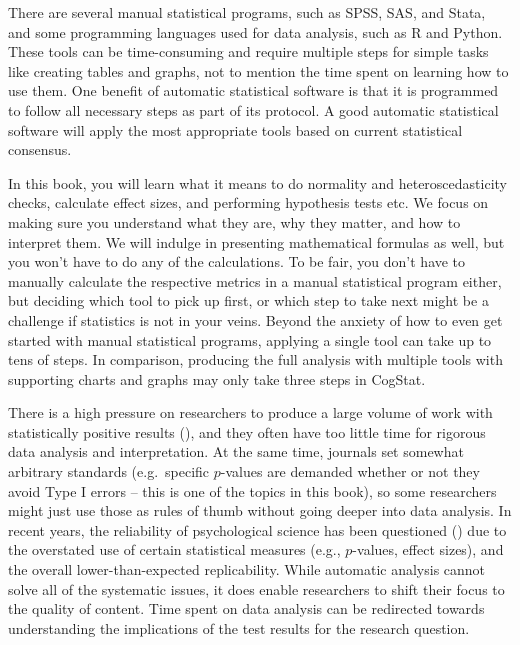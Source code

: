 \documentclass[
  11pt,
  a4paper,
  twoside,symmetric,openright]{book}
\theoremstyle{break}
\theoremstyle{break}
\begin{document}
There are several manual statistical programs, such as SPSS, SAS, and Stata, and some programming languages used for data analysis, such as R and Python. These tools can be time-consuming and require multiple steps for simple tasks like creating tables and graphs, not to mention the time spent on learning how to use them. One benefit of automatic statistical software is that it is programmed to follow all necessary steps as part of its protocol. A good automatic statistical software will apply the most appropriate tools based on current statistical consensus.

In this book, you will learn what it means to do normality and heteroscedasticity checks, calculate effect sizes, and performing hypothesis tests etc. We focus on making sure you understand what they are, why they matter, and how to interpret them. We will indulge in presenting mathematical formulas as well, but you won't have to do any of the calculations. To be fair, you don't have to manually calculate the respective metrics in a manual statistical program either, but deciding which tool to pick up first, or which step to take next might be a challenge if statistics is not in your veins. Beyond the anxiety of how to even get started with manual statistical programs, applying a single tool can take up to tens of steps. In comparison, producing the full analysis with multiple tools with supporting charts and graphs may only take three steps in CogStat.

There is a high pressure on researchers to produce a large volume of work with statistically positive results (), and they often have too little time for rigorous data analysis and interpretation. At the same time, journals set somewhat arbitrary standards (e.g.~specific \(p\)-values are demanded whether or not they avoid Type I errors -- this is one of the topics in this book), so some researchers might just use those as rules of thumb without going deeper into data analysis. In recent years, the reliability of psychological science has been questioned () due to the overstated use of certain statistical measures (e.g., \(p\)-values, effect sizes), and the overall lower-than-expected replicability. While automatic analysis cannot solve all of the systematic issues, it does enable researchers to shift their focus to the quality of content. Time spent on data analysis can be redirected towards understanding the implications of the test results for the research question.
\end{document}
